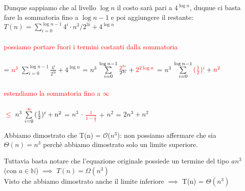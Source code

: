 \documentclass[../cheatSheetAlgoritmi.tex]{subfiles}
\begin{document}
Dunque sappiamo che al livello $\log{n}$ il costo sarà pari a $4^{\log{n}}$, duqnue ci basta fare la sommatoria fino a $\log{n-1}$ e poi aggiungere il restante:\\
$T(n)$ =  $\sum\limits_{i=0}^{\log{n-1}} {4^{i} \cdot n^{3}/2^{3i}} + 4^{\log{n}}$\\\\
\textcolor{red}{possiamo portare fuori i termini costanti dalla sommatoria}\\\\
= \textcolor{red}{$n^{3}$} $\sum\limits_{i=0}^{\log{n-1}} {\frac{4^{i}}{2^{3i}}} + 4^{\log{n}}$ = $n^{3}$ $\sum\limits_{i=0}^{\log{n-1}} {\frac{\textcolor{red}{2^{2i}}}{2^{3i}}} + \textcolor{red}{2^{2\log{n}}}$ = $n^{3}$ $\sum\limits_{i=0}^{\log{n-1}} {\textcolor{red}{(\frac{1}{2})^{i}}} + \textcolor{red}{n^{2}}$\\\\
\textcolor{red}{estendiamo la sommatoria fino a $\infty$}\\\\
\textcolor{red}{$\leq$} $n^{3}$ $\sum\limits_{i=0}^{\textcolor{red}{\infty}} {(\frac{1}{2})^{i}} + n^{2}$ =
$n^{3}$ $\cdot$ \textcolor{red}{$\frac{1}{1-\frac{1}{2}}$} + $n^{2}$ = $2n^{3} + n^2$
\newpage
\begin{flushleft}
Abbiamo dimostrato che T(n) = $\mathcal{O}$($n^{3}$): non possiamo affermare che sia $\Theta(n) = n^{3}$ perchè abbiamo dimostrato solo un limite superiore.
\end{flushleft}
Tuttavia basta notare che l'equazione originale possiede un termine del tipo $an^{3}$ (con $a \in \mathbb{N}$) $\implies$ $T(n) = \Omega(n^{3})$\\  
Visto che abbiamo dimostrato anche il limite inferiore $\implies$ T(n) = $\Theta(n^{3})$ 
\end{document}
